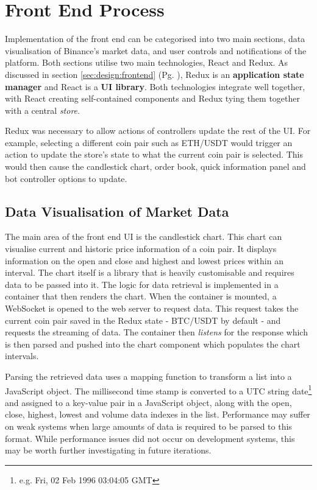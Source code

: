 \section{Front End Process}
\label{sec:implementation:frontend}

\noindent Implementation of the front end can be categorised into two main sections, data visualisation of Binance's market data, and user controls and notifications of the platform. Both sections utilise two main technologies, React and Redux. As discussed in section \ref{sec:design:frontend} (Pg. \pageref{sec:design:frontend}), Redux is an \textbf{application state manager} and React is a \textbf{UI library}. Both technologies integrate well together, with React creating self-contained components and Redux tying them together with a central \textit{store}.

Redux was necessary to allow actions of controllers update the rest of the UI. For example, selecting a different coin pair such as ETH/USDT would trigger an action to update the store's state to what the current coin pair is selected. This would then cause the candlestick chart, order book, quick information panel and bot controller options to update. 

\subsection{Data Visualisation of Market Data}
\label{sec:implementation:frontend:data_vis}
\noindent The main area of the front end UI is the candlestick chart. This chart can visualise current and historic price information of a coin pair. It displays information on the open and close and highest and lowest prices within an interval. The chart itself is a library that is heavily customisable and requires data to be passed into it. The logic for data retrieval is implemented in a container that then renders the chart. When the container is mounted, a WebSocket is opened to the web server to request data. This request takes the current coin pair saved in the Redux state - BTC/USDT by default - and requests the streaming of data. The container then \textit{listens} for the response which is then parsed and pushed into the chart component which populates the chart intervals.

Parsing the retrieved data uses a mapping function to transform a list into a JavaScript object. The millisecond time stamp is converted to a UTC string date\footnote{e.g. Fri, 02 Feb 1996 03:04:05 GMT} and assigned to a key-value pair in a JavaScript object, along with the open, close, highest, lowest and volume data indexes in the list. Performance may suffer on weak systems when large amounts of data is required to be parsed to this format. While performance issues did not occur on development systems, this may be worth further investigating in future iterations. 


